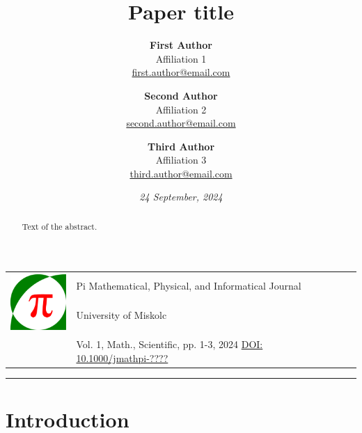 \documentclass[a4paper,12pt]{article}
\theoremstyle{definition}
\begin{document}
\pagestyle{fancy}

\title{\sc Paper title}

\author{
	\textbf{First Author} \\
	{\normalsize Affiliation 1} \\
	{\normalsize \href{mailto:first.author@email.com}{first.author@email.com}}
\and
	\textbf{Second Author} \\
	{\normalsize Affiliation 2} \\
	{\normalsize \href{mailto:second.author@email.com}{second.author@email.com}}
\and
	\textbf{Third Author} \\
	{\normalsize Affiliation 3} \\
	{\normalsize \href{mailto:third.author@email.com}{third.author@email.com}}
}

\date{\textit{24 September, 2024}}

\noindent \begin{tabular}{lp{13cm}}
	\multirow{3}{*}{\includegraphics[width=22mm, height=22mm]{jmathpi_logo.pdf}}
	& Pi Mathematical, Physical, and Informatical Journal \\
	& University of Miskolc \\
	& \\
	& Vol. 1, Math., Scientific, pp. 1-3, 2024 \hfill \href{https://doi.org/10.1000/jmathpi-1}{DOI: 10.1000/jmathpi-????} \\
\end{tabular}

\bigskip

\hrule

{\let\newpage\relax\maketitle}

\begin{abstract}
Text of the abstract.
\end{abstract}

{\def\thefootnote{}}

\section{Introduction}
\end{document}
